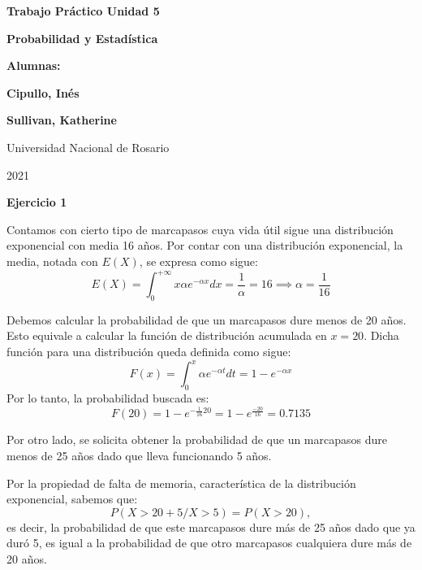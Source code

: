 \documentclass[11pt]{article}
\begin{document}
\begin{titlepage}
    \begin{center}
        \vfill
        \vfill
            \vspace{0.7cm}
            \noindent\textbf{\Huge Trabajo Pr\'actico Unidad 5}\par
            \noindent\textbf{\Huge Probabilidad y Estad\'istica}\par
            \vspace{.5cm}
        \vfill
        \noindent \textbf{\huge Alumnas:}\par
        \vspace{.5cm}
        \noindent \textbf{\Large Cipullo, In\'es}\par
        \noindent \textbf{\Large Sullivan, Katherine}\par
 
        \vfill
        \large Universidad Nacional de Rosario \par
        \noindent\large 2021
    \end{center}
\end{titlepage}
\par


\textbf{Ejercicio 1}

Contamos con cierto tipo de marcapasos cuya vida \'util sigue una distribuci\'on exponencial con media 16 a\~{n}os.
Por contar con una distribuci\'on exponencial, la media, notada con $E(X)$, se expresa como sigue: 
$$E(X) = \int_{0}^{+ \infty} x \alpha e^{-\alpha x} dx = \frac{1}{\alpha} = 16 \implies \alpha = \frac{1}{16}$$

Debemos calcular la probabilidad de que un marcapasos dure menos de 20 a\~{n}os. Esto equivale a calcular la funci\'on de distribuci\'on acumulada en $x=20$. Dicha funci\'on para una distribuci\'on queda definida como sigue: 
$$F(x) = \int_{0}^{x} \alpha e^{-\alpha t} dt = 1 - e^{-\alpha x}$$
Por lo tanto, la probabilidad buscada es: $$F(20) = 1 - e^{-\frac{1}{16} 20} = 1 - e^{\frac{-20}{16}} = 0.7135$$

Por otro lado, se solicita obtener la probabilidad de que un marcapasos dure menos de 25 a\~{n}os dado que lleva funcionando 5 a\~{n}os.

Por la propiedad de falta de memoria, caracter\'istica de la distribuci\'on exponencial, sabemos que: $$P(X > 20 + 5 / X > 5) =  P(X > 20),$$ 
es decir, la probabilidad de que este marcapasos dure m\'as de 25 a\~{n}os dado que ya dur\'o 5, es igual a la probabilidad de que otro marcapasos cualquiera dure m\'as de 20 a\~{n}os.
\end{document}

